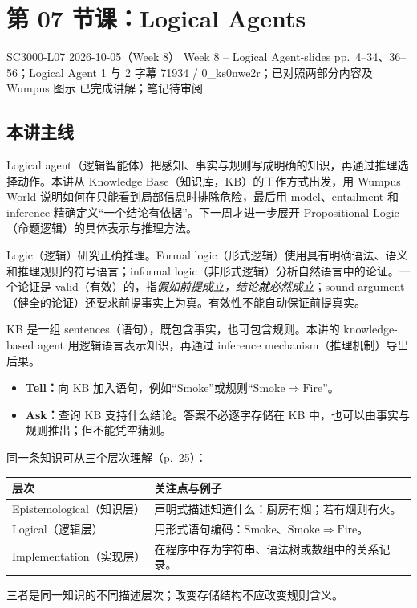 \section{第 07 节课：Logical Agents}
\label{lecture:SC3000-L07}

\lecturemeta
  {SC3000-L07}
  {2026-10-05（Week 8）}
  {Week 8 -- Logical Agent-slides}
  {pp.~4--34、36--56；Logical Agent 1 与 2}
  {字幕 71934 / 0\_ks0nwe2r；已对照两部分内容及 Wumpus 图示}
  {已完成讲解；笔记待审阅}

\subsection{本讲主线}

Logical agent（逻辑智能体）把感知、事实与规则写成明确的知识，再通过推理选择动作。本讲从 Knowledge Base（知识库，KB）的工作方式出发，用 Wumpus World 说明如何在只能看到局部信息时排除危险，最后用 model、entailment 和 inference 精确定义“一个结论有依据”。下一周才进一步展开 Propositional Logic（命题逻辑）的具体表示与推理方法。


Logic（逻辑）研究正确推理。Formal logic（形式逻辑）使用具有明确语法、语义和推理规则的符号语言；informal logic（非形式逻辑）分析自然语言中的论证。一个论证是 valid（有效）的，指\emph{假如前提成立，结论就必然成立}；sound argument（健全的论证）还要求前提事实上为真。有效性不能自动保证前提真实。

KB 是一组 sentences（语句），既包含事实，也可包含规则。本讲的 knowledge-based agent 用逻辑语言表示知识，再通过 inference mechanism（推理机制）导出后果。

\begin{itemize}
  \item \textbf{Tell：}向 KB 加入语句，例如“Smoke”或规则“$\mathrm{Smoke}\Rightarrow\mathrm{Fire}$”。
  \item \textbf{Ask：}查询 KB 支持什么结论。答案不必逐字存储在 KB 中，也可以由事实与规则推出；但不能凭空猜测。
\end{itemize}

同一条知识可从三个层次理解（p.~25）：
\begin{center}
\begin{tabularx}{\textwidth}{@{}lX@{}}
  \toprule
  层次 & 关注点与例子 \\
  \midrule
  Epistemological（知识层） & 声明式描述知道什么：厨房有烟；若有烟则有火。 \\
  Logical（逻辑层） & 用形式语句编码：$\mathrm{Smoke}$、$\mathrm{Smoke}\Rightarrow\mathrm{Fire}$。 \\
  Implementation（实现层） & 在程序中存为字符串、语法树或数组中的关系记录。 \\
  \bottomrule
\end{tabularx}
\end{center}
三者是同一知识的不同描述层次；改变存储结构不应改变规则含义。


